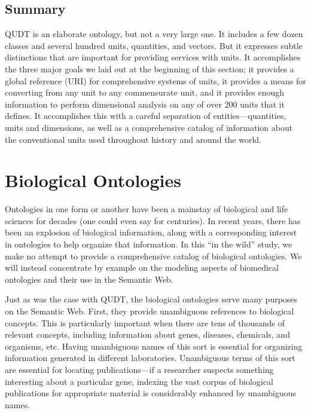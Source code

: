 \subsection{Summary}

QUDT is an elaborate ontology, but not a very large one. It includes a
few dozen classes and several hundred units, quantities, and vectors.
But it expresses subtle distinctions that are important for providing
services with units. It accomplishes the three major goals we laid out
at
the beginning of this section; it provides a global reference (URI) for
comprehensive systems of units, it provides a means for converting from
any unit to any commensurate unit, and it provides enough information to
perform dimensional analysis on any of over 200 units that it defines.
It accomplishes this with a careful separation of entities---quantities,
units and dimensions, as well as a comprehensive catalog of information
about the conventional units used throughout history and around the
world.

\section{Biological Ontologies}

Ontologies in one form or another have been a mainstay of biological and
life sciences for decades (one could even say for centuries). In recent
years, there has been an explosion of biological information, along with
a corresponding interest in ontologies to help organize that
information. In this ``in the wild'' study, we make no attempt to
provide a comprehensive catalog of biological ontologies. We will
instead concentrate by example on the modeling aspects of biomedical
ontologies and their use in the Semantic Web.

Just as was the case with QUDT, the biological ontologies serve many
purposes on the Semantic Web. First, they provide unambiguous references
to biological concepts. This is particularly important when there are
tens of thousands of relevant concepts, including information about
genes, diseases, chemicals, and organisms, etc. Having unambiguous names
of this sort is essential for organizing information generated in
different laboratories. Unambiguous terms of this sort are essential for
locating publications---if a researcher suspects something interesting
about a particular gene, indexing the vast corpus of biological
publications for appropriate material is considerably enhanced by
unambiguous names.

